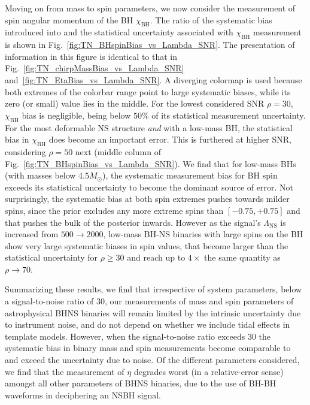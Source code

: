 \documentclass[aps,prd,amsmath,floats,floatfix, twocolumn,
superscriptaddress,nofootinbib,showpacs]{revtex4-1}
\newcommand{\lambdans}{\Lambda_\mathrm{NS}}
\newcommand{\chibh}{\chi_\mathrm{BH}}
\begin{document}
Moving on from mass to spin parameters, we now consider the measurement of spin
angular momentum of the BH $\chibh$. The ratio of the systematic bias introduced into
and the statistical uncertainty associated with $\chibh$ measurement is shown in
Fig.~\ref{fig:TN_BHspinBias_vs_Lambda_SNR}. The presentation of information in this 
figure is identical to that in Fig.~\ref{fig:TN_chirpMassBias_vs_Lambda_SNR}
and~\ref{fig:TN_EtaBias_vs_Lambda_SNR}. A diverging colormap is used because both 
extremes of the colorbar range point to large systematic biases, while its zero (or
small) value lies in the middle. For the lowest considered SNR $\rho=30$, $\chibh$
bias is negligible, being below $50\%$ of its statistical measurement uncertainty.
For the most deformable NS structure {\it and} with a low-mass BH, the statistical
bias in $\chibh$ does become an important error. This is furthered at higher SNR, 
considering $\rho=50$ next (middle column of Fig.~\ref{fig:TN_BHspinBias_vs_Lambda_SNR}).
We find that for low-mass BHs (with masses below $4.5M_\odot$), the systematic 
measurement bias for BH spin exceeds its statistical uncertainty to become the 
dominant source of error. Not surprisingly, the systematic bias at both spin 
extremes pushes towards milder spins, since the prior excludes any more extreme
spins than $[-0.75, +0.75]$ and that pushes the bulk of the posterior inwards.
However as the signal's $\lambdans$ is increased from $500\rightarrow 2000$,
low-mass BH-NS binaries with large spins on the BH show very large systematic biases
in spin values, that become larger than the statistical uncertainty for $\rho\geq 30$
and reach up to $4\times$ the same quantity as $\rho\rightarrow 70$.


Summarizing these results, we find that irrespective of system parameters, below a
signal-to-noise ratio of $30$, our measurements of mass and spin parameters of 
astrophysical BHNS binaries will remain limited by the intrinsic uncertainty due to 
instrument noise, and do not depend on whether we include tidal effects in template
models. However, when the signal-to-noise ratio exceeds $30$ the systematic bias in
binary mass and spin measurements become comparable to and exceed the uncertainty
due to noise. Of the different parameters considered, we find that the measurement 
of $\eta$ degrades worst (in a relative-error sense) amongst all other parameters
of BHNS binaries, due to the use of BH-BH waveforms in deciphering an NSBH signal.
\end{document}
